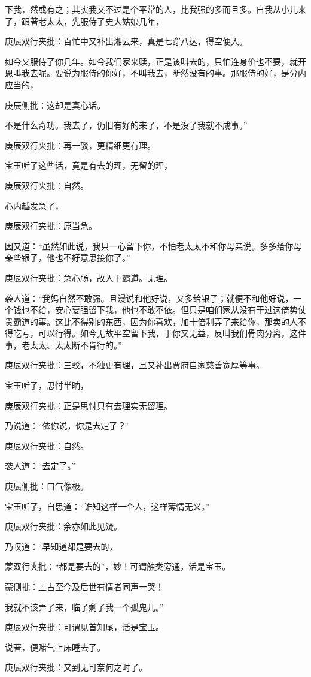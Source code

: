 \begin{parag}
下我，然或有之；其实我又不过是个平常的人，比我强的多而且多。自我从小儿来了，跟著老太太，先服侍了史大姑娘几年，\begin{note}庚辰双行夹批：百忙中又补出湘云来，真是七穿八达，得空便入。\end{note}如今又服侍了你几年。如今我们家来赎，正是该叫去的，只怕连身价也不要，就开恩叫我去呢。要说为服侍的你好，不叫我去，断然没有的事。那服侍的好，是分内应当的，\begin{note}庚辰侧批：这却是真心话。\end{note}不是什么奇功。我去了，仍旧有好的来了，不是没了我就不成事。”\begin{note}庚辰双行夹批：再一驳，更精细更有理。\end{note}宝玉听了这些话，竟是有去的理，无留的理，\begin{note}庚辰双行夹批：自然。\end{note}心内越发急了，\begin{note}庚辰双行夹批：原当急。\end{note}因又道：“虽然如此说，我只一心留下你，不怕老太太不和你母亲说。多多给你母亲些银子，他也不好意思接你了。”\begin{note}庚辰双行夹批：急心肠，故入于霸道。无理。\end{note}袭人道：“我妈自然不敢强。且漫说和他好说，又多给银子；就便不和他好说，一个钱也不给，安心要强留下我，他也不敢不依。但只是咱们家从没有干过这倚势仗贵霸道的事。这比不得别的东西，因为你喜欢，加十倍利弄了来给你，那卖的人不得吃亏，可以行得。如今无故平空留下我，于你又无益，反叫我们骨肉分离，这件事，老太太、太太断不肯行的。”\begin{note}庚辰双行夹批：三驳，不独更有理，且又补出贾府自家慈善宽厚等事。\end{note}宝玉听了，思忖半晌，\begin{note}庚辰双行夹批：正是思忖只有去理实无留理。\end{note}乃说道：“依你说，你是去定了？”\begin{note}庚辰双行夹批：自然。\end{note}袭人道：“去定了。”\begin{note}庚辰侧批：口气像极。\end{note}宝玉听了，自思道：“谁知这样一个人，这样薄情无义。”\begin{note}庚辰双行夹批：余亦如此见疑。\end{note}乃叹道：“早知道都是要去的，\begin{note}蒙双行夹批：“都是要去的”，妙！可谓触类旁通，活是宝玉。\end{note}\begin{note}蒙侧批：上古至今及后世有情者同声一哭！\end{note}我就不该弄了来，临了剩了我一个孤鬼儿。”\begin{note}庚辰双行夹批：可谓见首知尾，活是宝玉。\end{note}说著，便赌气上床睡去了。\begin{note}庚辰双行夹批：又到无可奈何之时了。\end{note}
\end{parag}


